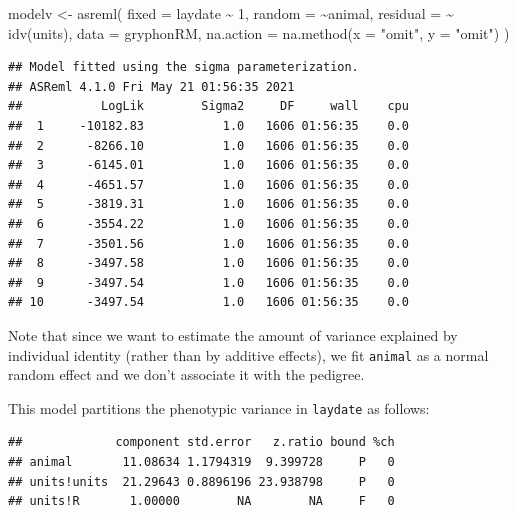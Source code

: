 \documentclass[
  12pt,
]{book}
\newenvironment{Shaded}{\begin{snugshade}}{\end{snugshade}}
\newcommand{\AttributeTok}[1]{\textcolor[rgb]{0.77,0.63,0.00}{#1}}
\newcommand{\DecValTok}[1]{\textcolor[rgb]{0.00,0.00,0.81}{#1}}
\newcommand{\FunctionTok}[1]{\textcolor[rgb]{0.00,0.00,0.00}{#1}}
\newcommand{\NormalTok}[1]{#1}
\newcommand{\OtherTok}[1]{\textcolor[rgb]{0.56,0.35,0.01}{#1}}
\newcommand{\SpecialCharTok}[1]{\textcolor[rgb]{0.00,0.00,0.00}{#1}}
\newcommand{\StringTok}[1]{\textcolor[rgb]{0.31,0.60,0.02}{#1}}
\begin{document}
\begin{Shaded}
\begin{Highlighting}[]
\NormalTok{modelv }\OtherTok{\textless{}{-}} \FunctionTok{asreml}\NormalTok{(}
  \AttributeTok{fixed =}\NormalTok{ laydate }\SpecialCharTok{\textasciitilde{}} \DecValTok{1}\NormalTok{,}
  \AttributeTok{random =} \SpecialCharTok{\textasciitilde{}}\NormalTok{animal,}
  \AttributeTok{residual =} \SpecialCharTok{\textasciitilde{}} \FunctionTok{idv}\NormalTok{(units),}
  \AttributeTok{data =}\NormalTok{ gryphonRM,}
  \AttributeTok{na.action =} \FunctionTok{na.method}\NormalTok{(}\AttributeTok{x =} \StringTok{"omit"}\NormalTok{, }\AttributeTok{y =} \StringTok{"omit"}\NormalTok{)}
\NormalTok{)}
\end{Highlighting}
\end{Shaded}

\begin{verbatim}
## Model fitted using the sigma parameterization.
## ASReml 4.1.0 Fri May 21 01:56:35 2021
##           LogLik        Sigma2     DF     wall    cpu
##  1     -10182.83           1.0   1606 01:56:35    0.0
##  2      -8266.10           1.0   1606 01:56:35    0.0
##  3      -6145.01           1.0   1606 01:56:35    0.0
##  4      -4651.57           1.0   1606 01:56:35    0.0
##  5      -3819.31           1.0   1606 01:56:35    0.0
##  6      -3554.22           1.0   1606 01:56:35    0.0
##  7      -3501.56           1.0   1606 01:56:35    0.0
##  8      -3497.58           1.0   1606 01:56:35    0.0
##  9      -3497.54           1.0   1606 01:56:35    0.0
## 10      -3497.54           1.0   1606 01:56:35    0.0
\end{verbatim}

Note that since we want to estimate the amount of variance explained by individual identity (rather than by additive effects), we fit \texttt{animal} as a normal random effect and we don't associate it with the pedigree.

This model partitions the phenotypic variance in \texttt{laydate} as follows:

\begin{Shaded}
\end{Shaded}

\begin{verbatim}
##             component std.error   z.ratio bound %ch
## animal       11.08634 1.1794319  9.399728     P   0
## units!units  21.29643 0.8896196 23.938798     P   0
## units!R       1.00000        NA        NA     F   0
\end{verbatim}
\end{document}
